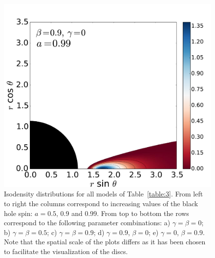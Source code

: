 \documentclass[referee]{aa}
\begin{document}
\begin{figure}
\includegraphics[scale=0.14]{figures/fig2_5_3.pdf}
\caption{Isodensity distributions for all models of Table~\ref{table:3}. From left to right the columns correspond to increasing values of the black hole spin: $a=0.5$, 0.9 and 0.99. From top to bottom the rows correspond to the following parameter combinations: a) $\gamma=\beta=0$; b) $\gamma=\beta=0.5$; c) $\gamma=\beta=0.9$; d) $\gamma=0.9$, $\beta=0$; e) $\gamma=0$, $\beta=0.9$. Note that the spatial scale of the plots differs as it has been chosen to facilitate the visualization of the discs.}
\label{models}
\end{figure}
\end{document}
